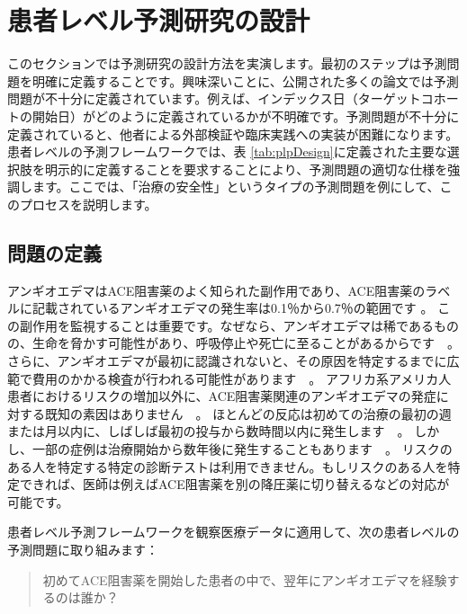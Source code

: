 \documentclass[
  11pt]{book}
\theoremstyle{definition}
\theoremstyle{definition}
\theoremstyle{definition}
\theoremstyle{definition}
\theoremstyle{remark}
\begin{document}
\section{患者レベル予測研究の設計}\label{ux60a3ux8005ux30ecux30d9ux30ebux4e88ux6e2cux7814ux7a76ux306eux8a2dux8a08}

このセクションでは予測研究の設計方法を実演します。最初のステップは予測問題を明確に定義することです。興味深いことに、公開された多くの論文では予測問題が不十分に定義されています。例えば、インデックス日（ターゲットコホートの開始日）がどのように定義されているかが不明確です。予測問題が不十分に定義されていると、他者による外部検証や臨床実践への実装が困難になります。患者レベルの予測フレームワークでは、表 \ref{tab:plpDesign}に定義された主要な選択肢を明示的に定義することを要求することにより、予測問題の適切な仕様を強調します。ここでは、「治療の安全性」というタイプの予測問題を例にして、このプロセスを説明します。 

\subsection{問題の定義}\label{ux554fux984cux306eux5b9aux7fa9-2}

アンギオエデマはACE阻害薬のよく知られた副作用であり、ACE阻害薬のラベルに記載されているアンギオエデマの発生率は0.1％から0.7％の範囲です \citep{byrd_2006}。 この副作用を監視することは重要です。なぜなら、アンギオエデマは稀であるものの、生命を脅かす可能性があり、呼吸停止や死亡に至ることがあるからです　\citep{norman_2013}。 さらに、アンギオエデマが最初に認識されないと、その原因を特定するまでに広範で費用のかかる検査が行われる可能性があります　\citep{norman_2013, thompson_1993}。 アフリカ系アメリカ人患者におけるリスクの増加以外に、ACE阻害薬関連のアンギオエデマの発症に対する既知の素因はありません　\citep{byrd_2006}。 ほとんどの反応は初めての治療の最初の週または月以内に、しばしば最初の投与から数時間以内に発生します　\citep{circardi_2004}。 しかし、一部の症例は治療開始から数年後に発生することもあります　\citep{mara_1996}。 リスクのある人を特定する特定の診断テストは利用できません。もしリスクのある人を特定できれば、医師は例えばACE阻害薬を別の降圧薬に切り替えるなどの対応が可能です。  

患者レベル予測フレームワークを観察医療データに適用して、次の患者レベルの予測問題に取り組みます：

\begin{quote}
初めてACE阻害薬を開始した患者の中で、翌年にアンギオエデマを経験するのは誰か？
\end{quote}
\end{document}
